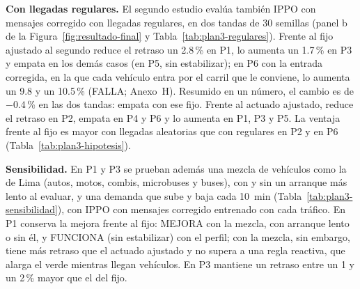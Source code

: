 \noindent\textbf{Con llegadas regulares.} El segundo estudio evalúa
también IPPO con mensajes corregido con llegadas regulares, en dos
tandas de 30 semillas (panel b de la Figura~\ref{fig:resultado-final} y
Tabla~\ref{tab:plan3-regulares}). Frente al fijo ajustado al segundo
reduce el retraso un 2.8\,\% en P1, lo aumenta un 1.7\,\% en P3 y empata
en los demás casos (en P5, sin estabilizar); en P6 con la entrada
corregida, en la que cada vehículo entra por el carril que le conviene,
lo aumenta un 9.8 y un 10.5\,\% (FALLA; Anexo~H). Resumido en un número,
el cambio es de $-0.4$\,\% en las dos tandas: empata con ese fijo. Frente
al actuado ajustado,
reduce el retraso en P2, empata en P4 y P6 y lo aumenta en P1, P3 y P5.
La ventaja frente al fijo es mayor con llegadas aleatorias que con
regulares en P2 y en P6 (Tabla~\ref{tab:plan3-hipotesis}).

\noindent\textbf{Sensibilidad.} En P1 y P3 se prueban además una mezcla
de vehículos como la de Lima (autos, motos, combis, microbuses y buses),
con y sin un arranque más lento al evaluar, y una demanda que sube y
baja cada 10~min (Tabla~\ref{tab:plan3-sensibilidad}), con IPPO con
mensajes corregido entrenado con cada tráfico. En P1 conserva la mejora
frente al fijo: MEJORA con la mezcla, con arranque lento o sin él, y
FUNCIONA (sin estabilizar) con el perfil; con la mezcla, sin embargo,
tiene más retraso que el actuado ajustado y no supera a una regla
reactiva, que alarga el verde mientras llegan vehículos. En P3 mantiene
un retraso entre un 1 y un 2\,\% mayor que el del fijo.

